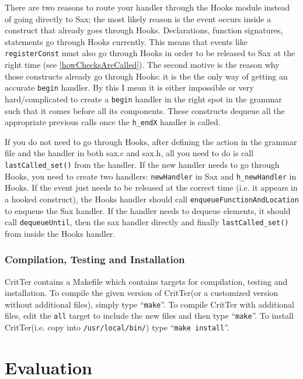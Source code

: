 \documentclass[12pt]{report}
\newcommand{\programName}{CritTer\xspace}
\begin{document}
There are two reasons to route your handler through the Hooks module instead of going directly to Sax; 
the most likely reason is the event occurs inside a construct that already goes through Hooks. 
Declarations, function signatures, statements go through Hooks currently. This means that events like 
\lstinline{registerConst} must also go through Hooks in order to be released to Sax at the right time (see 
\autoref{howChecksAreCalled}). The second motive is the reason why those constructs already go 
through Hooks:  it is the the only way of getting an accurate \lstinline{begin} handler. By this I mean it is 
either impossible or very hard/complicated to create a \lstinline{begin} handler in the right spot in the 
grammar such that it comes before all its components. These constructs dequeue all the appropriate 
previous calls once the \lstinline{h_endX} handler is called.

If you do not need to go through Hooks, after defining the action in the grammar file and the handler in 
both sax.c and sax.h, all you need to do is call \lstinline{lastCalled_set()} from the handler. If the new 
handler needs to go through Hooks, you need to create two handlers: \lstinline{newHandler} in Sax and 
\lstinline{h_newHandler} in Hooks. If the event just needs to be released at the correct time (i.e. it 
appears in a hooked construct), the Hooks handler should call \lstinline{enqueueFunctionAndLocation} 
to enqueue the Sax handler. If the handler needs to dequeue elements, it should call 
\lstinline{dequeueUntil}, then the sax handler directly and finally \lstinline{lastCalled_set()} from inside 
the Hooks handler. 

\subsection{Compilation, Testing and Installation}

\programName contains a Makefile which contains targets for compilation, testing and installation. To 
compile the given version of \programName (or a customized version without additional files), simply 
type ``\lstinline{make}''. To compile \programName with additional files, edit the \lstinline{all} target to 
include the new files and then type ``\lstinline{make}''. To install \programName (i.e. copy into 
\lstinline{/usr/local/bin/}) type ``\lstinline{make install}''.


\chapter{Evaluation}
\end{document}
